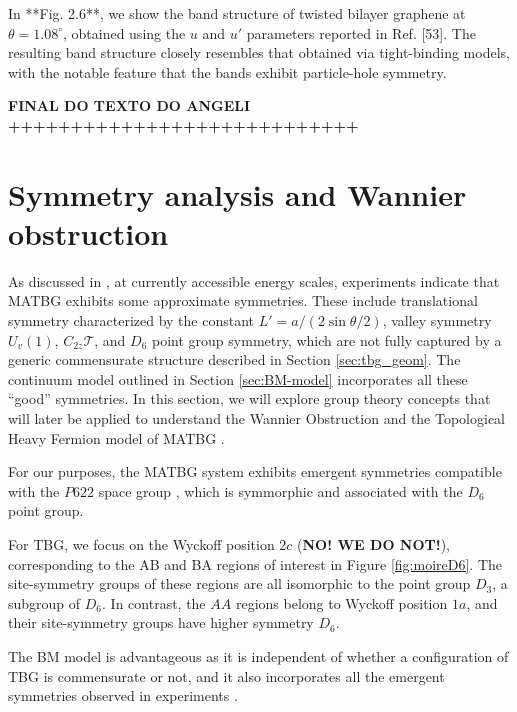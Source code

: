In **Fig. 2.6**, we show the band structure of twisted bilayer graphene at \( \theta = 1.08^\circ \), obtained using the \( u \) and \( u' \) parameters reported in Ref. [53]. The resulting band structure closely resembles that obtained via tight-binding models, with the notable feature that the bands exhibit particle-hole symmetry.

\textbf{FINAL DO TEXTO DO ANGELI ++++++++++++++++++++++++++++}

\section{Symmetry analysis and Wannier obstruction} \label{sec:wannier_obstruction}

As discussed in \cite{zou2018}, at currently accessible energy scales, experiments indicate that MATBG exhibits some approximate symmetries. These include translational symmetry characterized by the constant $L' = a / (2 \sin\theta/2)$, valley symmetry $U_v(1)$, $C_{2z} \mathcal{T}$, and $D_6$ point group symmetry, which are not fully captured by a generic commensurate structure described in Section \ref{sec:tbg_geom}. The continuum model outlined in Section \ref{sec:BM-model} incorporates all these ``good'' symmetries. In this section, we will explore group theory concepts that will later be applied to understand the Wannier Obstruction \cite{zou2018} and the Topological Heavy Fermion model of MATBG \cite{topoheavyfermion2022}.

For our purposes, the MATBG system exhibits emergent symmetries compatible with the $P622$ space group \cite{thesis_rennella}, which is symmorphic and associated with the $D_6$ point group.

For TBG, we focus on the Wyckoff position $2c$ (\textbf{NO! WE DO NOT!}), corresponding to the AB and BA regions of interest in Figure \ref{fig:moireD6}. The site-symmetry groups of these regions are all isomorphic to the point group $D_3$, a subgroup of $D_6$. In contrast, the $AA$ regions belong to Wyckoff position $1a$, and their site-symmetry groups have higher symmetry $D_6$.

The BM model is advantageous as it is independent of whether a configuration of TBG is commensurate or not, and it also incorporates all the emergent symmetries observed in experiments \cite{zou2018}.

